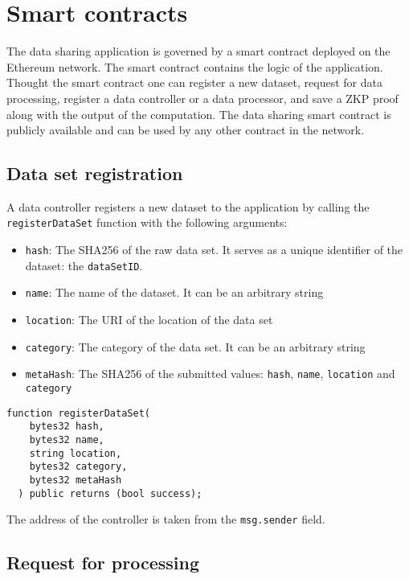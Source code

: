 \section{Smart contracts}
\label{implemenation:contracts}

The data sharing application is governed by a smart contract deployed on the Ethereum network. The smart contract contains the logic of the application. Thought the smart contract one can register a new dataset, request for data processing, register a data controller or a data processor, and save a ZKP proof along with the output of the computation. The data sharing smart contract is publicly available and can be used by any other contract in the network.

\subsection{Data set registration}
\label{implemenation:contracts:data_reg}

A data controller registers a new dataset to the application by calling the \verb|registerDataSet| function with the following arguments:

\begin{itemize}
  \item \verb|hash|: The SHA256 of the raw data set. It serves as a unique identifier of the dataset: the \verb|dataSetID|.
  \item \verb|name|: The name of the dataset. It can be an arbitrary string
  \item \verb|location|: The URI of the location of the data set
  \item \verb|category|: The category of the data set. It can be an arbitrary string
  \item \verb|metaHash|: The SHA256 of the submitted values: \verb|hash|, \verb|name|, \verb|location| and \verb|category|
\end{itemize}

\begin{lstlisting}[language=Solidity, caption={Data set registration function}]
  function registerDataSet(
    bytes32 hash,
    bytes32 name,
    string location,
    bytes32 category,
    bytes32 metaHash
  ) public returns (bool success);
\end{lstlisting}

The address of the controller is taken from the \verb|msg.sender| field.

\subsection{Request for processing}
\label{implemenation:contracts:req_pr}

